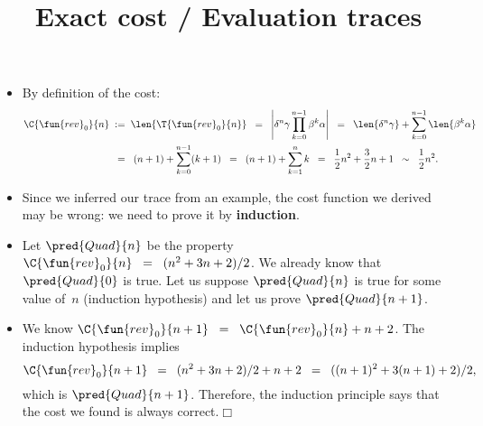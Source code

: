 \documentclass[wide]{slides}
\begin{document}
\begin{slide}
  \title{Exact cost / Evaluation traces}

  \begin{itemize}

    \item By definition of the cost:
      \begin{align*}
        \C{\fun{rev}_0}{n}
        & \;\; \text{:=} \;\; \len{\T{\fun{rev}_0}{n}}
        \;\; = \;\; \left\lvert\delta^n\gamma
        \prod_{k=0}^{n-1}{\beta^k\alpha}\right\lvert
        \;\; = \;\;
        \len{\delta^n\gamma} + \sum_{k=0}^{n-1}\len{\beta^k\alpha}\\
        & \;\; = \;\; (n+1) + \sum_{k=0}^{n-1}(k+1)
        \;\; = \;\; (n+1) + \sum_{k=1}^{n}k
        \;\; = \;\; \frac{1}{2}n^2 + \frac{3}{2}n + 1
        \;\; \sim \;\; \frac{1}{2}n^2.
      \end{align*}

    \item Since we inferred our trace from an example, the cost
      function we derived may be wrong: we need to prove it by
      \textbf{induction}.

    \item Let \(\pred{Quad}{n}\) be the property \(\C{\fun{rev}_0}{n}
      \;\; = \;\; (n^2 + 3n + 2)/2\). We already know that
      \(\pred{Quad}{0}\) is true. Let us suppose \(\pred{Quad}{n}\) is
      true for some value of~\(n\) (induction hypothesis) and let us
      prove \(\pred{Quad}{n+1}\).

    \item We know \(\C{\fun{rev}_0}{n+1} \;\; = \;\;
      \C{\fun{rev}_0}{n} + n + 2\). The induction hypothesis implies
      \begin{equation*}
        \C{\fun{rev}_0}{n+1} \;\; = \;\; (n^2 + 3n + 2)/2 + n + 2 \;\;
        = \;\; ((n+1)^2 + 3(n+1) + 2)/2,
      \end{equation*}
      which is \(\pred{Quad}{n+1}\). Therefore, the induction
      principle says that the cost we found is always
      correct.\hfill\(\Box\)

  \end{itemize}

\end{slide}
\end{document}

